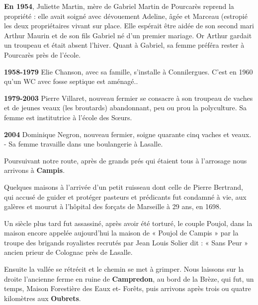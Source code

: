 
\textbf{En 1954}, Juliette Martin, mère de Gabriel Martin de Pourcarès reprend la propriété : elle avait
soigné avec dévouement Adeline, âgée et Marceau (estropié les deux propriétaires vivant sur
place. Elle espérait être aidée de son second mari Arthur Maurin et de son fils Gabriel né
d’un premier mariage. Or Arthur gardait un troupeau et était absent l’hiver. Quant à Gabriel,
sa femme préféra rester à Pourcarès près de l’école.

\textbf{1958-1979} \hspace{0.3cm} Elie Chanson, avec sa famille, s’installe à Connilergues. C’est en 1960 qu’un
WC avec fosse septique est aménagé..

\textbf{1979-2003} \hspace{0.3cm} Pierre Villaret, nouveau fermier se consacre à son troupeau de vaches et de
jeunes veaux (les broutards) abandonnant, peu ou prou la polyculture.
Sa femme est institutrice à l’école des Sœurs.

\textbf{2004} \hspace{1.25cm} Dominique Negron, nouveau fermier, soigne quarante cinq vaches et veaux. -
Sa femme travaille dans une boulangerie à Lasalle.

\vspace{0.4cm}

Poursuivant notre route, après de grands prés qui étaient tous à l’arrosage nous arrivons à
\textbf{Campis}.

Quelques maisons à l’arrivée d’un petit ruisseau dont celle de Pierre Bertrand, qui accusé de
guider et protéger pasteurs et prédicants fut condamné à vie, aux galères et mourut à l’hôpital
des forçats de Marseille à 29 ans, en 1698.

Un siècle plus tard fut assassiné, après avoir été torturé, le couple Poujol, dans la maison
encore appelée aujourd’hui la maison de « Poujol de Campis » par la troupe des brigands
royalistes recrutés par Jean Louis Solier dit : « Sans Peur » ancien prieur de Colognac près de
Lasalle.

Ensuite la vallée se rétrécit et le chemin se met à grimper. Nous laissons sur la droite
l’ancienne ferme en ruine de \textbf{Campredon}, au bord de la Brèze, qui fut, un temps, Maison
Forestière des Eaux et- Forêts, puis arrivons après trois ou quatre kilomètres aux \textbf{Oubrets}.

